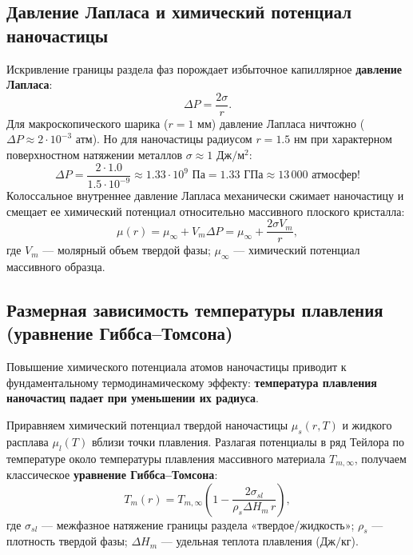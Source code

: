 \documentclass[12pt,a4paper]{article}
\begin{document}
\subsection{Давление Лапласа и химический потенциал наночастицы}
Искривление границы раздела фаз порождает избыточное капиллярное \textbf{давление Лапласа}:
\begin{equation}
\Delta P = \frac{2\sigma}{r}.
\label{eq:laplace_pressure}
\end{equation}
Для макроскопического шарика ($r = 1\text{ мм}$) давление Лапласа ничтожно ($\Delta P \approx 2\cdot 10^{-3}\text{ атм}$). Но для наночастицы радиусом $r = 1.5\text{ нм}$ при характерном поверхностном натяжении металлов $\sigma \approx 1\text{ Дж}/\text{м}^2$:
\begin{equation*}
\Delta P = \frac{2 \cdot 1.0}{1.5 \cdot 10^{-9}} \approx 1.33 \cdot 10^9\text{ Па} = 1.33\text{ ГПа} \approx 13\,000\text{ атмосфер!}
\end{equation*}
Колоссальное внутреннее давление Лапласа механически сжимает наночастицу и смещает ее химический потенциал относительно массивного плоского кристалла:
\begin{equation}
\mu(r) = \mu_\infty + V_m \Delta P = \mu_\infty + \frac{2\sigma V_m}{r},
\label{eq:chem_pot_curved}
\end{equation}
где $V_m$ --- молярный объем твердой фазы; $\mu_\infty$ --- химический потенциал массивного образца.

\subsection{Размерная зависимость температуры плавления (уравнение Гиббса--Томсона)}
Повышение химического потенциала атомов наночастицы приводит к фундаментальному термодинамическому эффекту: \textbf{температура плавления наночастиц падает при уменьшении их радиуса}.

Приравняем химический потенциал твердой наночастицы $\mu_s(r, T)$ и жидкого расплава $\mu_l(T)$ вблизи точки плавления. Разлагая потенциалы в ряд Тейлора по температуре около температуры плавления массивного материала $T_{m,\infty}$, получаем классическое \textbf{уравнение Гиббса--Томсона}:
\begin{equation}
T_m(r) = T_{m,\infty} \left( 1 - \frac{2\sigma_{sl}}{\rho_s \Delta H_m \, r} \right),
\label{eq:gibbs_thomson}
\end{equation}
где $\sigma_{sl}$ --- межфазное натяжение границы раздела «твердое/жидкость»; $\rho_s$ --- плотность твердой фазы; $\Delta H_m$ --- удельная теплота плавления ($\text{Дж}/\text{кг}$).
\end{document}
